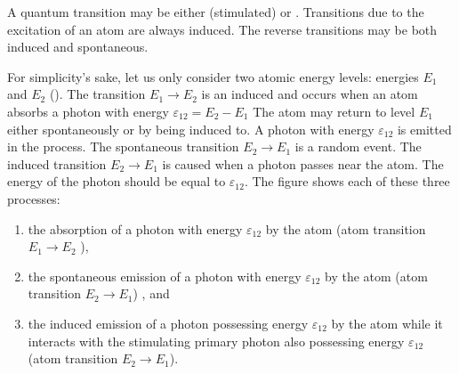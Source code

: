 A quantum transition may be either  (stimulated) or
. Transitions due to the excitation of an atom are always
induced. The reverse transitions may be both induced and spontaneous.

For simplicity's sake, let us only consider two atomic energy levels:
energies $E_{1}$ and $E_{2}$ (). The transition $E_{1} \to E_{2}$ is an induced and occurs when an atom absorbs a photon with energy $\varepsilon_{12} = E_{2} - E_{1}$ The atom may return to level $E_{1}$ either spontaneously or by being induced to. A photon with energy $\varepsilon_{12}$ is emitted in the process. The spontaneous transition $E_{2} \to E_{1}$ is a random event. The induced transition $E_{2} \to E_{1}$ is caused when a photon passes near the atom. The energy of the photon should be equal to $\varepsilon_{12}$. The figure shows each of these three processes: 

\begin{enumerate}[label=(\alph*),noitemsep,nolistsep]
\item the absorption of a photon with energy $\varepsilon_{12}$ by the atom (atom transition  $E_{1} \to E_{2}$ ), 
\item the spontaneous emission of a photon with energy $\varepsilon_{12}$ by the atom (atom transition $E_{2} \to E_{1}$) , and
\item the induced emission of a photon possessing energy $\varepsilon_{12}$ by the atom while it interacts with the stimulating primary photon also possessing energy $\varepsilon_{12}$ (atom transition $E_{2} \to E_{1}$).
\end{enumerate}

